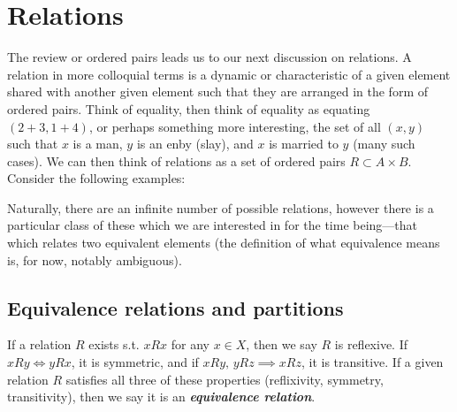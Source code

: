 \documentclass{report}
\begin{document}
\section{Relations}

The review or ordered pairs leads us to our next discussion on relations. A relation in more colloquial terms is a dynamic or characteristic of a given element shared with another given element such that they are arranged in the form of ordered pairs. Think of equality, then think of equality as equating \( (2+3,1+4) \), or perhaps something more interesting, the set of all \( (x,y) \) such that \( x \) is a man, \( y \) is an enby (slay), and \( x \) is married to \( y \) (many such cases). We can then think of relations as a set of ordered pairs \( R \subset A\times B \). Consider the following examples:

Naturally, there are an infinite number of possible relations, however there is a particular class of these which we are interested in for the time being---that which relates two equivalent elements (the definition of what equivalence means is, for now, notably ambiguous). 
\subsection{Equivalence relations and partitions}

If a relation \( R \) exists s.t. \( xRx \) for any \( x \in  X \), then we say \( R \) is reflexive. If \( xRy \iff yRx \), it is symmetric, and if \( xRy, \,  yRz \implies xRz \), it is transitive. If a given relation \( R \) satisfies all three of these properties (reflixivity, symmetry, transitivity), then we say it is an \textbf{\textit{equivalence relation}}. 

\end{document}
